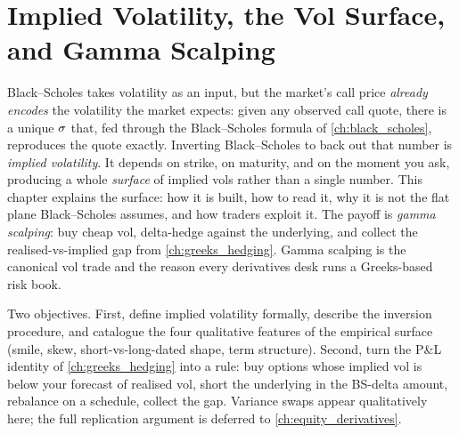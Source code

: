 \chapter{Implied Volatility, the Vol Surface, and Gamma Scalping}
\label{ch:vol_surface}

Black--Scholes takes volatility as an input, but the market's call
price \emph{already encodes} the volatility the market expects:
given any observed call quote, there is a unique $\sigma$ that,
fed through the Black--Scholes formula of \cref{ch:black_scholes},
reproduces the quote exactly. Inverting Black--Scholes to back out
that number is \emph{implied volatility}. It depends on strike, on
maturity, and on the moment you ask, producing a whole
\emph{surface} of implied vols rather than a single number. This
chapter explains the surface: how it is built, how to read it, why
it is not the flat plane Black--Scholes assumes, and how traders
exploit it. The payoff is \emph{gamma scalping}: buy cheap vol,
delta-hedge against the underlying, and collect the
realised-vs-implied gap from \cref{ch:greeks_hedging}. Gamma
scalping is the canonical vol trade and the reason every
derivatives desk runs a Greeks-based risk book.

Two objectives. First, define implied volatility formally, describe
the inversion procedure, and catalogue the four qualitative
features of the empirical surface (smile, skew,
short-vs-long-dated shape, term structure). Second, turn the P\&L
identity of \cref{ch:greeks_hedging} into a rule: buy options
whose implied vol is below your forecast of realised vol, short
the underlying in the BS-delta amount, rebalance on a schedule,
collect the gap. Variance swaps appear qualitatively here; the
full replication argument is deferred to
\cref{ch:equity_derivatives}.

